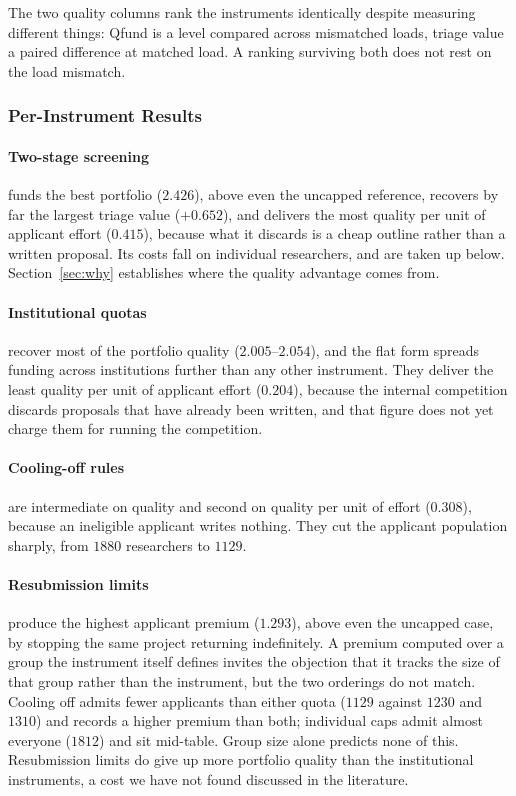 \documentclass[11pt,a4paper]{article}
\begin{document}
The two quality columns rank the instruments identically despite measuring
different things: Qfund is a level compared across mismatched loads, triage value
a paired difference at matched load. A ranking surviving both does not rest on the
load mismatch.

\subsubsection{Per-Instrument Results}

\paragraph{Two-stage screening} funds the best portfolio ($2.426$), above even the
uncapped reference, recovers by far the largest triage value ($+0.652$), and
delivers the most quality per unit of applicant effort ($0.415$), because what it
discards is a cheap outline rather than a written proposal. Its costs fall on
individual researchers, and are taken up below. Section~\ref{sec:why} establishes where
the quality advantage comes from.

\paragraph{Institutional quotas} recover most of the portfolio quality
($2.005$--$2.054$), and the flat form spreads funding across institutions further
than any other instrument. They deliver the least quality per unit of applicant
effort ($0.204$), because the internal competition discards proposals that
have already been written, and that figure does not yet charge them for running
the competition.

\paragraph{Cooling-off rules} are intermediate on quality and second on quality
per unit of effort ($0.308$), because an ineligible applicant writes nothing. They
cut the applicant population sharply, from $1880$ researchers to $1129$.

\paragraph{Resubmission limits} produce the highest applicant premium ($1.293$),
above even the uncapped case, by stopping the same project returning
indefinitely. A premium computed over a group the instrument itself defines invites the
objection that it tracks the size of that group rather than the instrument, but
the two orderings do not match. Cooling off admits fewer applicants than either
quota ($1129$ against $1230$ and $1310$) and records a higher premium than both;
individual caps admit almost everyone ($1812$) and sit mid-table. Group size alone
predicts none of this. Resubmission limits do give up more portfolio quality than
the institutional instruments, a cost we have not found discussed in the
literature.
\end{document}
